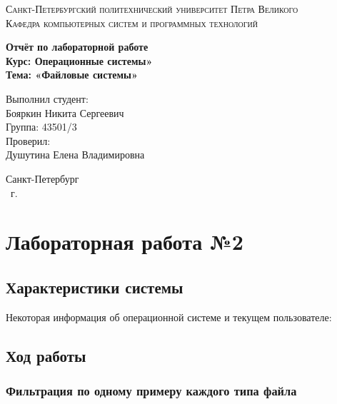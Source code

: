 \documentclass[14pt,a4paper,report]{report}
\begin{document}
\def\contentsname{Содержание}

\begin{titlepage}
	\begin{center}
		\textsc{Санкт-Петербургский политехнический 
			университет Петра Великого\\[5mm]
			Кафедра компьютерных систем и программных технологий}
		
		\vfill
		
		\textbf{Отчёт по лабораторной работе\\[3mm]
			Курс: Операционные системы»\\[6mm]
			Тема: «Файловые системы»\\[35mm]
		}
	\end{center}
	
	\hfill
	\begin{minipage}{.5\textwidth}
		Выполнил студент:\\[2mm] 
		Бояркин Никита Сергеевич\\
		Группа: 43501/3\\[5mm]
		
		Проверил:\\[2mm] 
		Душутина Елена Владимировна
	\end{minipage}
	\vfill
	\begin{center}
		Санкт-Петербург\\ \the\year\ г.
	\end{center}
\end{titlepage}

\tableofcontents
\clearpage

\chapter{Лабораторная работа №2}

\section{Характеристики системы}

Некоторая информация об операционной системе и текущем пользователе:



\section{Ход работы}

\subsection{Фильтрация по одному примеру каждого типа файла}
\end{document}
